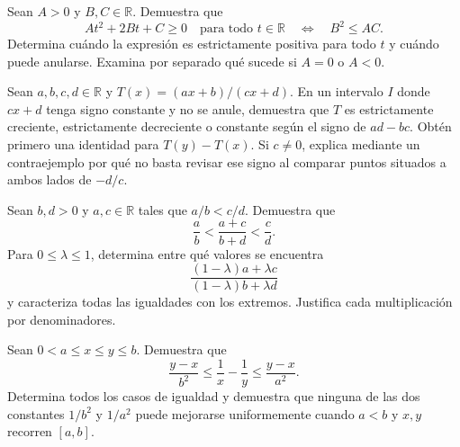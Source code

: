 \begin{samepage}
\begin{problem}\label{prob:reto-orden-04}
Sean $A>0$ y $B,C\in\mathbb R$. Demuestra que
\[
At^2+2Bt+C\ge0\quad\text{para todo }t\in\mathbb R
\quad\Longleftrightarrow\quad B^2\le AC.
\]
Determina cuándo la expresión es estrictamente positiva para todo $t$ y cuándo puede anularse. Examina por separado qué sucede si $A=0$ o $A<0$.
\end{problem}
\end{samepage}
\par{}

\begin{samepage}
\begin{problem}\label{prob:reto-orden-05}
Sean $a,b,c,d\in\mathbb R$ y $T(x)=(ax+b)/(cx+d)$. En un intervalo $I$ donde $cx+d$ tenga signo constante y no se anule, demuestra que $T$ es estrictamente creciente, estrictamente decreciente o constante según el signo de $ad-bc$. Obtén primero una identidad para $T(y)-T(x)$. Si $c\ne0$, explica mediante un contraejemplo por qué no basta revisar ese signo al comparar puntos situados a ambos lados de $-d/c$.
\end{problem}
\end{samepage}
\par{}

\begin{samepage}
\begin{problem}\label{prob:reto-orden-06}
Sean $b,d>0$ y $a,c\in\mathbb R$ tales que $a/b<c/d$. Demuestra que
\[
\frac ab<\frac{a+c}{b+d}<\frac cd.
\]
Para $0\le\lambda\le1$, determina entre qué valores se encuentra
\[
\frac{(1-\lambda)a+\lambda c}{(1-\lambda)b+\lambda d}
\]
y caracteriza todas las igualdades con los extremos. Justifica cada multiplicación por denominadores.
\end{problem}
\end{samepage}
\par{}

\begin{samepage}
\begin{problem}\label{prob:reto-orden-07}
Sean $0<a\le x\le y\le b$. Demuestra que
\[
\frac{y-x}{b^2}\le\frac1x-\frac1y\le\frac{y-x}{a^2}.
\]
Determina todos los casos de igualdad y demuestra que ninguna de las dos constantes $1/b^2$ y $1/a^2$ puede mejorarse uniformemente cuando $a<b$ y $x,y$ recorren $[a,b]$.
\end{problem}
\end{samepage}
\par{}

